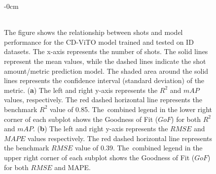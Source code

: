 \documentclass[12pt,a4paper,oneside]{report}
\newlength{\extralength}
\begin{document}
\begin{landscape}
\begin{figure}
  \begin{adjustwidth}{-\extralength}{0cm}
   \centering
  \\
  \\
  \end{adjustwidth}
  \caption{The figure shows the relationship between shots and model performance
  for the CD-ViTO model trained and tested on ID datasets.
  The x-axis represents the number of shots.  The solid lines represent the mean values, while the dashed lines indicate the shot amount/metric 
  prediction model. The shaded area around the solid lines represents the confidence interval (standard deviation) of the metric.
  (\textbf{a}) The left and right y-axis represents the $R^2$ and $mAP$ values, respectively.
  The red dashed horizontal line represents the benchmark $R^2$ value of 0.85. The~combined
  legend in the lower right corner of each subplot shows the Goodness of Fit ($GoF$) for both $R^2$
  and $mAP$.
  (\textbf{b}) The left and right y-axis represents the $RMSE$ and $MAPE$ values respectively.
  The red dashed horizontal line represents the benchmark $RMSE$ value of 0.39. The~combined
  legend in the upper right corner of each subplot shows the Goodness of Fit ($GoF$) for both $RMSE$
  and MAPE.}
  \label{fig:shots_vs_performance}
\end{figure}
\end{landscape}
\end{document}
